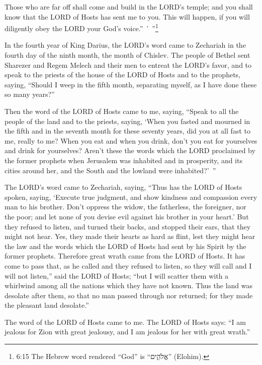 \myverse{}Those who are far off shall come and build in the LORD’s temple;
and you shall know that the LORD of Hosts has sent me to you. This will happen, if you will diligently
obey the LORD your God’s voice.” ’ ”\footnote{6:15 The Hebrew word rendered “God” is “אֱלֹהִ֑ים” (Elohim).}


\mychapter{} \myverse*{}In the fourth year of King Darius, the LORD’s word came to Zechariah
in the fourth day of the ninth month, the month of Chislev.
\myverse{}The people of Bethel sent Sharezer and Regem Melech and their men to entreat
the LORD’s favor,
\myverse{}and to speak to the priests of the house of the LORD of Hosts and to the prophets,
saying, “Should I weep in the fifth month, separating myself, as I have done these so many years?”

\myverse{}Then the word of the LORD of Hosts came to me, saying,
\myverse{}“Speak to all the people of the land and to the priests, saying, ‘When you fasted
and mourned in the fifth and in the seventh month for these seventy years, did you at all fast to me,
really to me?
\myverse{}When you eat and when you drink, don’t you eat for yourselves and drink for
yourselves?
\myverse{}Aren’t these the words which the LORD proclaimed by the former prophets when
Jerusalem was inhabited and in prosperity, and its cities around her, and the South and the lowland were
inhabited?’ ”

\myverse{}The LORD’s word came to Zechariah, saying,
\myverse{}“Thus has the LORD of Hosts spoken, saying, ‘Execute true judgment, and show
kindness and compassion every man to his brother.
\myverse{}Don’t oppress the widow, the fatherless, the foreigner, nor the poor; and
let none of you devise evil against his brother in your heart.’
\myverse{}But they refused to listen, and turned their backs, and stopped their ears,
that they might not hear.
\myverse{}Yes, they made their hearts as hard as flint, lest they might hear the law
and the words which the LORD of Hosts had sent by his Spirit by the former prophets. Therefore great wrath
came from the LORD of Hosts.
\myverse{}It has come to pass that, as he called and they refused to listen, so they
will call and I will not listen,” said the LORD of Hosts;
\myverse{}“but I will scatter them with a whirlwind among all the nations which they
have not known. Thus the land was desolate after them, so that no man passed through nor returned; for
they made the pleasant land desolate.”


\mychapter{} \myverse*{}The word of the LORD of Hosts came to me.
\myverse{}The LORD of Hosts says: “I am jealous for Zion with great jealousy, and I am
jealous for her with great wrath.”

